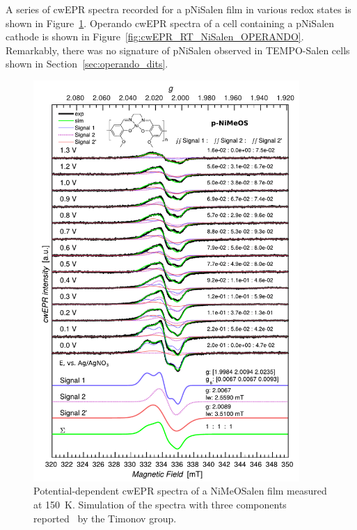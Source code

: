 A series of cwEPR spectra recorded for a pNiSalen film in various redox states is shown in Figure~\ref{fig:cwEPR_CRYO_NiSalen_REDOX_SIM}. Operando cwEPR spectra of a cell containing a pNiSalen cathode is shown in Figure~\ref{fig:cwEPR_RT_NiSalen_OPERANDO}. Remarkably, there was no signature of pNiSalen observed in TEMPO-Salen cells shown in Section~\ref{sec:operando_dits}.
\begin{figure}[h]
\center
	\includegraphics[width=0.9\textwidth]{./operando_epr/figures/CRYO/Figure_S8.pdf}
	\caption{Potential-dependent cwEPR spectra of a NiMeOSalen film measured at 150~K. Simulation of the spectra with three components reported~\cite{Dmitrieva2018} by the Timonov group.}
	\label{fig:cwEPR_CRYO_NiSalen_REDOX_SIM}
\end{figure}
